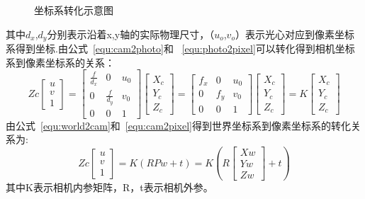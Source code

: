 \begin{figure}[H]
  \centering%
  \hspace{6em}%
  \caption{坐标系转化示意图}
  \label{fig:trans}
\end{figure}
其中$d_x$,$d_y$分别表示沿着x,y轴的实际物理尺寸，（$u_o$,$v_o$）表示光心对应到像素坐标系得到坐标.由公式~\ref{equ:cam2photo}和
~\ref{equ:photo2pixel}可以转化得到相机坐标系到像素坐标系的关系：
\begin{equation}
Z c\left[\begin{array}{l}{u} \\ {v} \\ {1}\end{array}\right]=\left[\begin{array}{ccc}{\frac{f}{d_{x}}} & {0} & {u_{0}} \\ {0} & {\frac{f}{d_{y}}} & {v_{0}} \\ {0} & {0} & {1}\end{array}\right]\left[\begin{array}{c}{X_{c}} \\ {Y_{c}} \\ {Z_{c}}\end{array}\right]=\left[\begin{array}{ccc}{f_{x}} & {0} & {u_{0}} \\ {0} & {f_{y}} & {v_{0}} \\ {0} & {0} & {1}\end{array}\right]\left[\begin{array}{c}{X_{c}} \\ {Y_{c}} \\ {Z_{c}}\end{array}\right]=K\left[\begin{array}{c}{X_{c}} \\ {Y_{c}} \\ {Z_{c}}\end{array}\right]
  \label{equ:cam2pixel}
\end{equation}
由公式~\ref{equ:world2cam}和~\ref{equ:cam2pixel}得到世界坐标系到像素坐标系的转化关系为:
\begin{equation}
Z c\left[\begin{array}{l}{u} \\ {v} \\ {1}\end{array}\right]=K(R P w+t)=K\left(R\left[\begin{array}{l}{X w} \\ {Y w} \\ {Z w}\end{array}\right]+t\right)
\end{equation}
其中K表示相机内参矩阵，R，t表示相机外参。 

